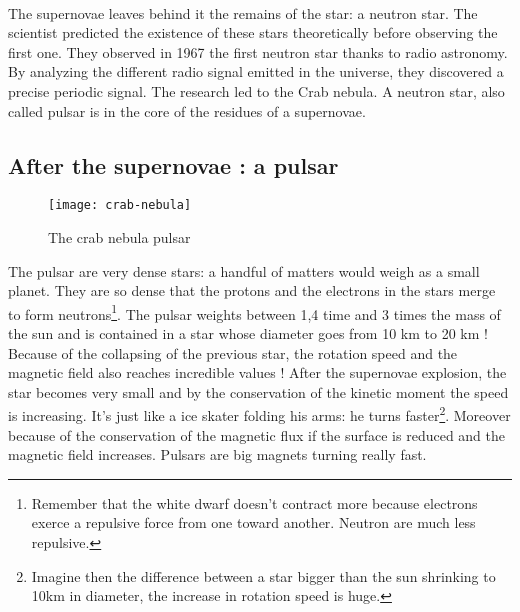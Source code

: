 \documentclass[a4paper, 11pt]{article} %
\begin{document}
\paragraph*{}
The supernovae leaves behind it the remains of the star: a neutron star. The scientist predicted the existence of these stars theoretically before observing the first one. They observed in 1967 the first neutron star thanks to radio astronomy. By analyzing the different radio signal emitted in the universe, they discovered a precise periodic signal. The research led to the Crab nebula. A neutron star, also called pulsar is in the core of the residues of a supernovae.

\subsection{After the supernovae : a pulsar}

\begin{figure}[h]
\centering
\texttt{[image: crab-nebula]}
\caption{The crab nebula pulsar}
\end{figure}

 The pulsar are very dense stars: a handful of matters would weigh as a small planet. They are so dense that the protons and the electrons in the stars merge to form neutrons\footnote{Remember that the white dwarf doesn't contract more because electrons exerce a repulsive force from one toward another. Neutron are much less repulsive.}. The pulsar weights between 1,4 time and 3 times the mass of the sun and is contained in a star whose diameter goes from 10 km to 20 km ! Because of the collapsing of the previous star, the rotation speed and the magnetic field also reaches incredible values ! 
After the supernovae explosion, the star becomes very small and by the conservation of the kinetic moment the speed is increasing. It's just like a ice skater folding his arms: he turns faster\footnote{Imagine then the difference between a star bigger than the sun shrinking to 10km in diameter, the increase in rotation speed is huge.}. Moreover because of the conservation of the magnetic flux if the surface is reduced and the magnetic field increases. Pulsars are big magnets turning really fast.
\end{document}
